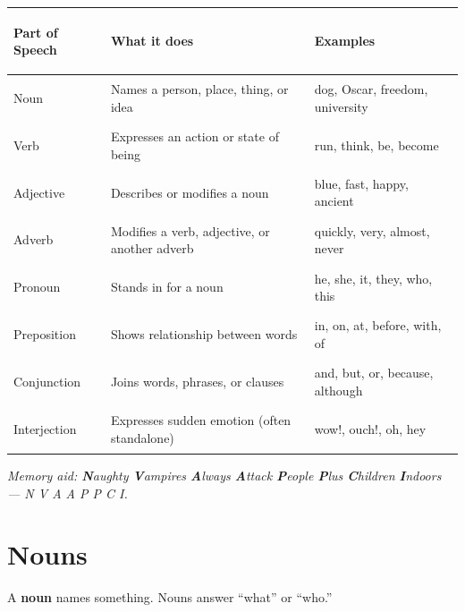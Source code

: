 \documentclass[11pt, letterpaper]{article}
\begin{document}
\noindent
{\small\renewcommand{\arraystretch}{1.5}
\begin{tabularx}{\textwidth}{>{\bfseries\raggedright\arraybackslash}p{2.6cm}
                              >{\raggedright\arraybackslash}X
                              >{\raggedright\arraybackslash}p{4cm}}
\toprule
\rowcolor{tableheader}
\textbf{Part of Speech} & \textbf{What it does} & \textbf{Examples} \\
\midrule
\rowcolor{rowA}  Noun         & Names a person, place, thing, or idea       & dog, Oscar, freedom, university \\
\rowcolor{rowB}  Verb         & Expresses an action or state of being        & run, think, be, become \\
\rowcolor{rowA}  Adjective    & Describes or modifies a noun                  & blue, fast, happy, ancient \\
\rowcolor{rowB}  Adverb       & Modifies a verb, adjective, or another adverb & quickly, very, almost, never \\
\rowcolor{rowA}  Pronoun      & Stands in for a noun                          & he, she, it, they, who, this \\
\rowcolor{rowB}  Preposition  & Shows relationship between words              & in, on, at, before, with, of \\
\rowcolor{rowA}  Conjunction  & Joins words, phrases, or clauses              & and, but, or, because, although \\
\rowcolor{rowB}  Interjection & Expresses sudden emotion (often standalone)   & wow!, ouch!, oh, hey \\
\bottomrule
\end{tabularx}}

\vspace{4pt}
\textit{Memory aid: \textbf{N}aughty \textbf{V}ampires \textbf{A}lways \textbf{A}ttack \textbf{P}eople \textbf{P}lus \textbf{C}hildren \textbf{I}ndoors --- N V A A P P C I.}

\section*{Nouns}

A \textbf{noun} names something. Nouns answer ``what'' or ``who.''
\end{document}
